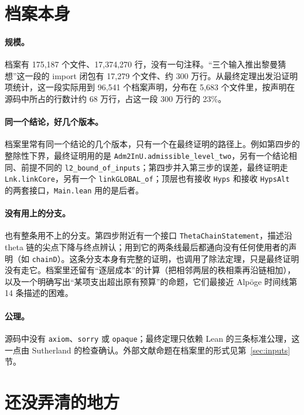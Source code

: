 \documentclass[11pt]{article}
\newcommand{\Lean}[1]{\texttt{\small #1}}
\begin{document}
\section{档案本身}\label{sec:archive}

\paragraph{规模。} 档案有 175{,}187 个文件、17{,}374{,}270 行，没有一句注释。“三个输入推出黎曼猜想”这一段的 import 闭包有 17{,}279 个文件、约 300 万行。从最终定理出发沿证明项统计，这一段实际用到 96{,}541 个档案声明，分布在 5{,}683 个文件里，按声明在源码中所占的行数计约 68 万行，占这一段 300 万行的 23\%。%

\paragraph{同一个结论，好几个版本。} 档案里常有同一个结论的几个版本，只有一个在最终证明的路径上。例如第四步的整除性下界，最终证明用的是 \Lean{Adm2InU.admissible\_level\_two}，另有一个结论相同、前提不同的 \Lean{l2\_bound\_of\_inputs}；第四步并入第三步的误差，最终证明走 \Lean{Lnk.linkCore}，另有一个 \Lean{linkGLOBAL\_of}；顶层也有接收 \Lean{Hyps} 和接收 \Lean{HypsAlt} 的两套接口，\Lean{Main.lean} 用的是后者。

\paragraph{没有用上的分支。} 也有整条用不上的分支。第四步附近有一个接口 \Lean{ThetaChainStatement}，描述沿 theta 链的尖点下降与终点辨认；用到它的两条线最后都通向没有任何使用者的声明（如 \Lean{chainD}）。这条分支本身有完整的证明，也调用了除法定理，只是最终证明没有走它。档案里还留有“逐层成本”的计算（把相邻两层的秩相乘再沿链相加），以及一个明确写出“某项支出超出原有预算”的命题，它们最接近 Alpöge 时间线第 14 条描述的困难。

\paragraph{公理。} 源码中没有 \Lean{axiom}、\Lean{sorry} 或 \Lean{opaque}；最终定理只依赖 Lean 的三条标准公理，这一点由 Sutherland 的检查确认。外部文献命题在档案里的形式见第~\ref{sec:inputs} 节。

\section{还没弄清的地方}\label{sec:open}
\end{document}
